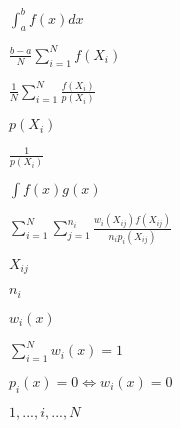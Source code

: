 \documentclass{article}
\begin{document}
$ \int_a^b f(x)dx$
\pagebreak

$ \frac{b - a}{N} \sum_{i=1}^N f(X_i) $
\pagebreak

$ \frac{1}{N} \sum_{i=1}^N \frac{f(X_i)}{p(X_i)} $
\pagebreak

$p(X_i)$
\pagebreak

$\frac{1}{p(X_i)}$
\pagebreak

$ \int f(x)g(x) $
\pagebreak

$ \sum_{i=1}^N \sum_{j=1}^{n_i} \frac{w_{i}(X_{ij})f(X_{ij})}{n_ip_i(X_{ij})} $
\pagebreak

$X_{ij}$
\pagebreak

$n_i$
\pagebreak

$ w_i(x)$
\pagebreak

$ \sum_{i=1}^N w_i(x) = 1 $
\pagebreak

$ p_i(x) = 0 \iff w_i(x) = 0 $
\pagebreak

$ {1, ..., i, ..., N} $
\pagebreak
\end{document}
